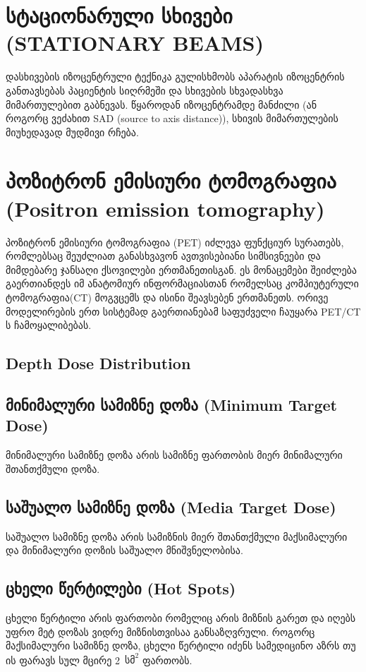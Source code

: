 \documentclass[12pt,a4paper,]{report}
\begin{document}
\section{სტაციონარული სხივები (STATIONARY BEAMS)}
დასხივების იზოცენტრული ტექნიკა გულისხმობს აპარატის იზოცენტრის განთავსებას პაციენტის სიღრმეში და სხივების სხვადასხვა მიმართულებით გაბნევას. წყაროდან იზოცენტრამდე მანძილი (ან როგორც ვეძახით SAD (source to axis distance)), სხივის მიმართულების მიუხედავად მუდმივი რჩება.

\section{პოზიტრონ ემისიური ტომოგრაფია (Positron emission tomography)}
პოზიტრონ ემისიური ტომოგრაფია (PET) იძლევა ფუნქციურ სურათებს, რომლებსაც შეუძლიათ განასხვავონ ავთვისებიანი სიმსივნეები და მიმდებარე ჯანსაღი ქსოვილები ერთმანეთისგან. ეს მონაცემები შეიძლება გაერთიანდეს იმ ანატომიურ ინფორმაციასთან რომელსაც კომპიუტერული ტომოგრაფია(CT) მოგვცემს და ისინი შეავსებენ ერთმანეთს. ორივე მოდელირების ერთ სისტემად გაერთიანებამ საფუძველი ჩაუყარა PET/CT ს ჩამოყალიბებას.

	
\subsection{Depth Dose Distribution}

\subsection{მინიმალური სამიზნე დოზა (Minimum Target Dose)}
მინიმალური სამიზნე დოზა არის სამიზნე ფართობის მიერ მინიმალური შთანთქმული დოზა.

\subsection{საშუალო სამიზნე დოზა (Media Target Dose)}
საშუალო სამიზნე დოზა არის სამიზნის მიერ შთანთქმული მაქსიმალური და მინიმალური დოზის საშუალო მნიშვნელობისა.  

\subsection{ცხელი წერტილები (Hot Spots)}
ცხელი წერტილი არის ფართობი რომელიც არის მიზნის გარეთ და იღებს უფრო მეტ დოზას ვიდრე მიზნისთვისაა განსაზღვრული. როგორც მაქსიმალური სამიზნე დოზა, ცხელი წერტილი იძენს სამედიცინო აზრს თუ ის ფარავს სულ მცირე 2~$\text{სმ}^2$ ფართობს.
\end{document}
